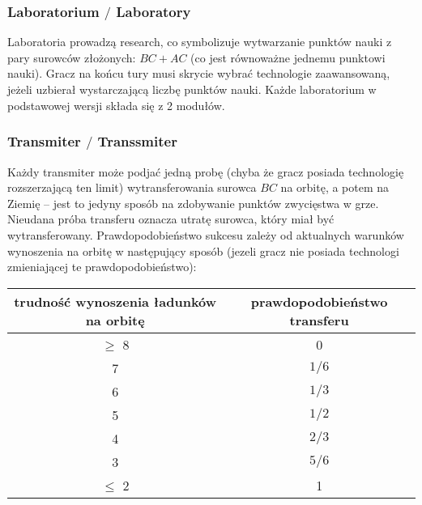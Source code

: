 \documentclass[11pt,a4paper]{article}
\begin{document}
\subsubsection{Laboratorium $/$ Laboratory}

Laboratoria prowadzą research, co symbolizuje wytwarzanie punktów nauki z pary surowców złożonych: $BC + AC$ (co jest równoważne jednemu punktowi nauki). Gracz na końcu tury musi skrycie wybrać technologie zaawansowaną, jeżeli uzbierał wystarczającą liczbę punktów nauki. Każde laboratorium w podstawowej wersji składa się z 2 modułów. 

\subsubsection{Transmiter $/$ Transsmiter}

Każdy transmiter może podjać jedną probę (chyba że gracz posiada technologię rozszerzającą ten limit) wytransferowania surowca $BC$ na orbitę, a potem na Ziemię -- jest to jedyny sposób na zdobywanie punktów zwycięstwa w grze. Nieudana próba transferu oznacza utratę surowca, który miał być wytransferowany. Prawdopodobieństwo sukcesu zależy od aktualnych warunków wynoszenia na orbitę w następujący sposób (jezeli gracz nie posiada technologi zmieniającej te prawdopodobieństwo):
\begin{center}
  \begin{tabular}{| c | c |}
    \hline
    \textbf{trudność wynoszenia ładunków na orbitę} & \textbf{prawdopodobieństwo transferu}\\
    \hline
     $\ge$ 8 & 0 \\
    \hline
    7 & $1/6$ \\
    \hline
    6 & $1/3$ \\
    \hline
    5 & $1/2$ \\
    \hline
    4 & $2/3$ \\
    \hline
    3 & $5/6$ \\
    \hline
     $\le$ 2  & 1 \\
    \hline
  \end{tabular}
\end{center}
\end{document}
